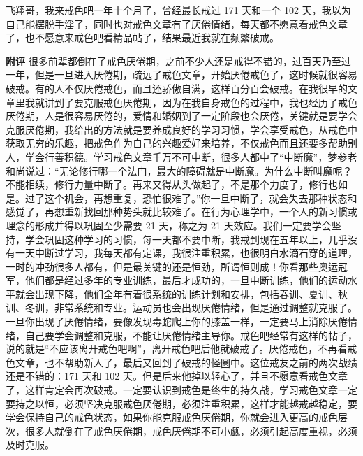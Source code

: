 \begin{case}
    飞翔哥，我来戒色吧一年十个月了，曾经最长戒过 171 天和一个 102 天，我以为自己能摆脱手淫了，同时也对戒色文章有了厌倦情绪，每天都不愿意看戒色文章了，也不愿意来戒色吧看精品帖了，结果最近我就在频繁破戒。

    \textbf{附评} 很多前辈都倒在了戒色厌倦期，之前不少人还是戒得不错的，过百天乃至过一年，但是一旦进入厌倦期，疏远了戒色文章，开始厌倦戒色了，这时候就很容易破戒。有的人不仅厌倦戒色，而且还骄傲自满，这样百分百会破戒。在我很早的文章里我就讲到了要克服戒色厌倦期，因为在我自身戒色的过程中，我也经历了戒色厌倦期，人是很容易厌倦的，爱情和婚姻到了一定阶段也会厌倦，关键就是要学会克服厌倦期，我给出的方法就是要养成良好的学习习惯，学会享受戒色，从戒色中获取无穷的乐趣，把戒色作为自己的兴趣爱好来培养，不仅戒色而且还要多帮助别人，学会行善积德。学习戒色文章千万不可中断，很多人都中了“中断魔”，梦参老和尚说过：“无论修行哪一个法门，最大的障碍就是中断魔。为什么中断叫魔呢？不能相续，修行力量中断了。再来又得从头做起了，不是那个力度了，修行也如是。过了这个机会，再想重复，恐怕很难了。”你一旦中断了，就会失去那种状态和感觉了，再想重新找回那种势头就比较难了。在行为心理学中，一个人的新习惯或理念的形成并得以巩固至少需要 21 天，称之为 21 天效应。我们一定要学会坚持，学会巩固这种学习的习惯，每一天都不要中断，我戒到现在五年以上，几乎没有一天中断过学习，我每天都有定课，我很注重积累，也很明白水滴石穿的道理，一时的冲劲很多人都有，但是最关键的还是恒劲，所谓恒则成！你看那些奥运冠军，他们都是经过多年的专业训练，最后才成功的，一旦中断训练，他们的运动水平就会出现下降，他们全年有着很系统的训练计划和安排，包括春训、夏训、秋训、冬训，非常系统和专业。运动员也会出现厌倦情绪，但是通过调整就克服了。一旦你出现了厌倦情绪，要像发现毒蛇爬上你的膝盖一样，一定要马上消除厌倦情绪，自己要学会调整和克服，不能让厌倦情绪主导你。戒色吧经常有这样的帖子，说的就是“不应该离开戒色吧啊”，离开戒色吧后他就破戒了。厌倦戒色，不再看戒色文章，也不帮助新人了，最后又回到了破戒的怪圈中。这位戒友之前的两次战绩还是不错的：171 天和 102 天。但是后来他掉以轻心了，并且不愿意看戒色文章了，这样肯定会再次破戒。一定要认识到戒色是终生的持久战，学习戒色文章一定要持之以恒，必须坚决克服戒色厌倦期，必须注重积累，这样才能越戒越稳定，要学会保持自己的戒色状态，如果你能克服戒色厌倦期，你就会进入更高的戒色层次，很多人就倒在了戒色厌倦期，戒色厌倦期不可小觑，必须引起高度重视，必须及时克服。
\end{case}

